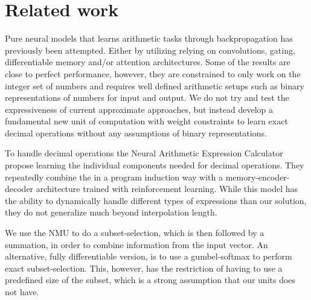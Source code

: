 \section{Related work}
Pure neural models that learns arithmetic tasks through backpropagation has previously been attempted.
Either by utilizing relying on convolutions, gating, differentiable memory and/or attention architectures\cite{NeuralGPU,GridLSTM,NTM}.
Some of the results are close to perfect performance, however, they are constrained to only work on the integer set of numbers and requires well defined arithmetic setups such as binary representations of numbers for input and output.
We do not try and test the expressiveness of current approximate approaches, but instead develop a fundamental new unit of computation with weight constraints to learn exact decimal operations without any assumptions of binary representations.

To handle decimal operations the Neural Arithmetic Expression Calculator\cite{NAEC} propose learning the individual components needed for decimal operations.
They repeatedly combine the in a program induction way with a memory-encoder-decoder architecture trained with reinforcement learning.
While this model has the ability to dynamically handle different types of expressions than our solution, they do not generalize much beyond interpolation length.

We use the NMU to do a subset-selection, which is then followed by a summation, in order to combine information from the input vector.
An alternative, fully differentiable version, is to use a gumbel-softmax to perform exact subset-selection\cite{DSS}.
This, however, has the restriction of having to use a predefined size of the subset, which is a strong assumption that our units does not have.


% 
